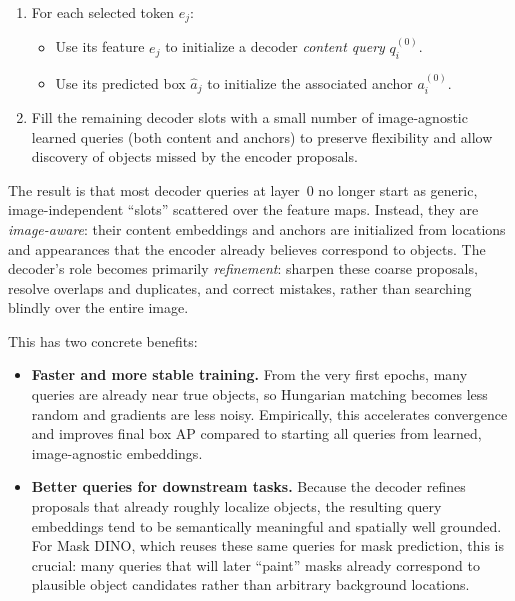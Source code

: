 \begin{enrichment}
\begin{enrichment}
\begin{enumerate}
			\item For each selected token $e_j$:
			\begin{itemize}
				\item Use its feature $e_j$ to initialize a decoder \emph{content query} $q^{(0)}_i$.
				\item Use its predicted box $\hat{a}_j$ to initialize the associated anchor $a^{(0)}_i$.
			\end{itemize}
			\item Fill the remaining decoder slots with a small number of image-agnostic learned queries (both content and anchors) to preserve flexibility and allow discovery of objects missed by the encoder proposals.
		\end{enumerate}
		
		The result is that most decoder queries at layer~0 no longer start as generic, image-independent ``slots'' scattered over the feature maps. Instead, they are \emph{image-aware}: their content embeddings and anchors are initialized from locations and appearances that the encoder already believes correspond to objects. The decoder's role becomes primarily \emph{refinement}: sharpen these coarse proposals, resolve overlaps and duplicates, and correct mistakes, rather than searching blindly over the entire image.
		
		This has two concrete benefits:
		\begin{itemize}
			\item \textbf{Faster and more stable training.} From the very first epochs, many queries are already near true objects, so Hungarian matching becomes less random and gradients are less noisy. Empirically, this accelerates convergence and improves final box AP compared to starting all queries from learned, image-agnostic embeddings.
			\item \textbf{Better queries for downstream tasks.} Because the decoder refines proposals that already roughly localize objects, the resulting query embeddings tend to be semantically meaningful and spatially well grounded. For Mask DINO, which reuses these same queries for mask prediction, this is crucial: many queries that will later ``paint'' masks already correspond to plausible object candidates rather than arbitrary background locations.
		\end{itemize}
		

\end{enrichment}
\end{enrichment}
